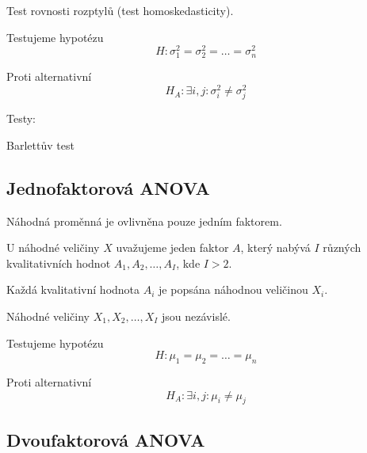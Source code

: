 \begin{compactitem}
    \item Test rovnosti rozptylů (test homoskedasticity).

    \item Testujeme hypotézu
    $$ H : \sigma^2_1 = \sigma^2_2 = \ldots = \sigma^2_n $$

    \item Proti alternativní
    $$ H_A : \exists i, j : \sigma^2_i \not= \sigma^2_j $$

    \item Testy: \begin{compactitem}
        \item Barlettův test
    \end{compactitem}
\end{compactitem}

\subsection{Jednofaktorová ANOVA}

\begin{compactitem}
    \item Náhodná proměnná je ovlivněna pouze jedním faktorem.

    \item U náhodné veličiny $X$ uvažujeme jeden faktor $A$, který nabývá $I$ různých kvalitativních
    hodnot $A_1, A_2, \ldots, A_I$, kde $I > 2$. \begin{compactitem}

        \item Každá kvalitativní hodnota $A_i$ je popsána náhodnou veličinou $X_i$.

        \item Náhodné veličiny $X_1, X_2, \ldots, X_I$ jsou nezávislé.
    \end{compactitem}

    \item Testujeme hypotézu
    $$ H : \mu_1 = \mu_2 = \ldots = \mu_n $$

    \item Proti alternativní
    $$ H_A : \exists i, j : \mu_i \not= \mu_j $$
\end{compactitem}

\subsection{Dvoufaktorová ANOVA}

